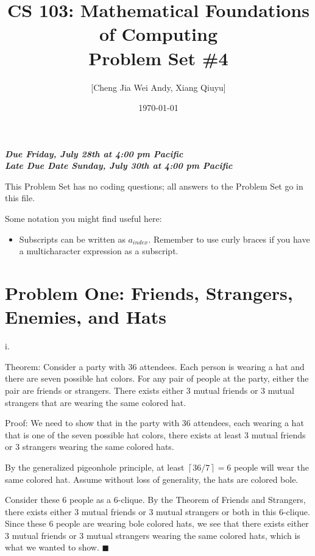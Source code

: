 \documentclass{article}
\title{CS 103: Mathematical Foundations of Computing\\Problem Set \#4}
\author{[Cheng Jia Wei Andy, Xiang Qiuyu]}
\date{\today}
\renewcommand{\(}{\left(}
\renewcommand{\)}{\right)}
\newcommand{\ceil}[1]{\left\lceil#1\right\rceil}
\renewcommand\qedsymbol{$\blacksquare$}
\renewcommand{\emph}[1]{\textit{\textbf{#1}}}
\theoremstyle{plain}
\theoremstyle{plain}
\theoremstyle{definition}
\begin{document}
\maketitle

\maketitle

\begin{center}
  \emph{Due Friday, July 28th at 4:00 pm Pacific} \\
  \emph{Late Due Date Sunday, July 30th at 4:00 pm Pacific}
\end{center}

\vspace{1cm}

This Problem Set has no coding questions; all answers to the Problem Set go in this file.

Some notation you might find useful here:

\begin{itemize}
    \item Subscripts can be written as $a_{index}$. Remember to use curly braces if you have a multicharacter expression as a subscript.
\end{itemize}

\newpage

\section*{Problem One: Friends, Strangers, Enemies, and Hats}
    i.
    \begin{shaded}
        Theorem: Consider a party with 36 attendees. Each person is wearing a hat and there are seven possible hat colors. For any pair of people at the party, either the pair are friends or strangers. There exists either 3 mutual friends or 3 mutual strangers that are wearing the same colored hat.

        \vspace{4mm}

        Proof: We need to show that in the party with 36 attendees, each wearing a hat that is one of the seven possible hat colors, there exists at least 3 mutual friends or 3 strangers wearing the same colored hats.

        \vspace{4mm}

        By the generalized pigeonhole principle, at least $\ceil{36/7}=6$ people will wear the same colored hat. Assume without loss of generality, the hats are colored bole.

        \vspace{4mm}

        Consider these 6 people as a 6-clique. By the Theorem of Friends and Strangers, there exists either 3 mutual friends or 3 mutual strangers or both in this 6-clique. Since these 6 people are wearing bole colored hats, we see that there exists either 3 mutual friends or 3 mutual strangers wearing the same colored hats, which is what we wanted to show. \qedsymbol
    \end{shaded}
    
\end{document}
